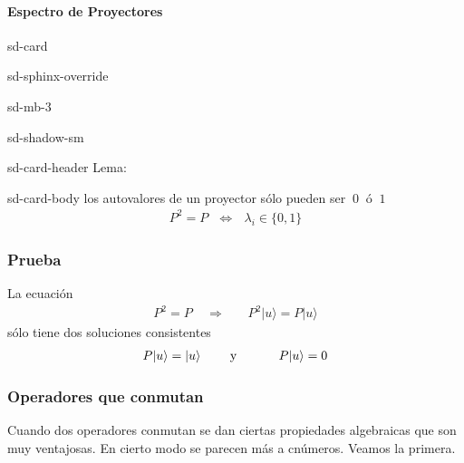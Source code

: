 \documentclass[letterpaper,10pt,english]{jupyterBook}
\newcommand{\ket}[1]{|#1\rangle}
\begin{document}
\paragraph{Espectro de Proyectores}
\label{\detokenize{docs/Part_01_Formalismo/Chapter_01_02_Formalismo_matem_xe1tico/01_03_Operadores_myst:espectro-de-proyectores}}
\begin{sphinxuseclass}{sd-card}
\begin{sphinxuseclass}{sd-sphinx-override}
\begin{sphinxuseclass}{sd-mb-3}
\begin{sphinxuseclass}{sd-shadow-sm}
\begin{sphinxuseclass}{sd-card-header}
\sphinxAtStartPar
Lema:

\end{sphinxuseclass}
\begin{sphinxuseclass}{sd-card-body}
\sphinxAtStartPar
los autovalores de un proyector sólo pueden ser \(~0~\) ó \(~1~\)
\begin{equation*}
\begin{split}
P^2= P ~~~\Longleftrightarrow ~~~\lambda_i \in \{0,1\}
\end{split}
\end{equation*}
\end{sphinxuseclass}
\end{sphinxuseclass}
\end{sphinxuseclass}
\end{sphinxuseclass}
\end{sphinxuseclass}\subsubsection*{Prueba}

\sphinxAtStartPar
La ecuación
\begin{equation*}
\begin{split} P^2 = P ~~~~~\Rightarrow ~~~~~~~~ P^2 \ket{u} = P\ket{u} \end{split}
\end{equation*}
\sphinxAtStartPar
sólo tiene dos soluciones consistentes
\begin{equation*}
\begin{split}
P\ket{u} = \ket{u}~~~~~~~\hbox{y} ~~~~~~~~~~P\ket{u} = 0
\end{split}
\end{equation*}

\subsubsection{Operadores que conmutan}
\label{\detokenize{docs/Part_01_Formalismo/Chapter_01_02_Formalismo_matem_xe1tico/01_03_Operadores_myst:operadores-que-conmutan}}
\sphinxAtStartPar
Cuando dos operadores conmutan se dan ciertas propiedades algebraicas que son muy ventajosas. En cierto modo se parecen más a c\sphinxhyphen{}números. Veamos la primera.
\end{document}
